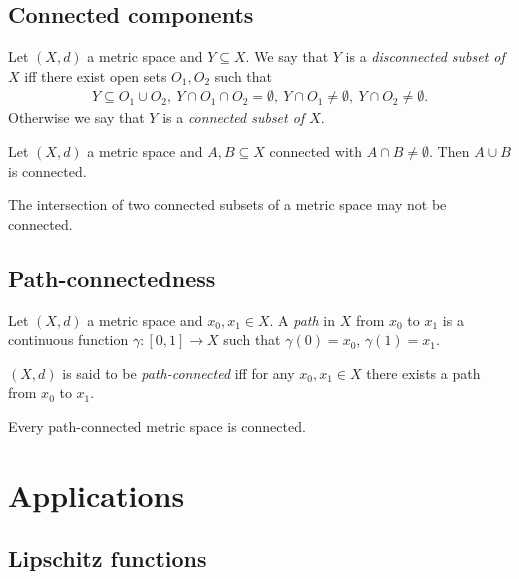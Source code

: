 \documentclass{article}
\begin{document}
\subsection{Connected components}

\begin{definition}
	Let $(X,d)$ a metric space and $Y\subseteq X$. We say that $Y$ is a \emph{disconnected
		subset of $X$} iff there exist open sets $O_1,O_2$ such that
	\begin{align*}
		Y\subseteq O_1\cup O_2,\: Y\cap O_1\cap O_2 = \emptyset,\: Y\cap O_1\neq\emptyset,
		\:Y\cap O_2\not=\emptyset.
	\end{align*}
	Otherwise we say that $Y$ is a \emph{connected subset of $X$}.
\end{definition}

\begin{proposition}[10.11]
	Let $(X,d)$ a metric space and $A,B\subseteq X$ connected with $A\cap B\neq\emptyset$.
	Then $A\cup B$ is connected.
\end{proposition}

\begin{lemma}
	The intersection of two connected subsets of a metric space may not be connected.
\end{lemma}

\subsection{Path-connectedness}

\begin{definition}
	Let $(X,d)$ a metric space and $x_0,x_1\in X$. A \emph{path} in $X$ from $x_0$ to $x_1$ is a
	continuous function $\gamma:[0,1]\to X$ such that $\gamma(0)=x_0$, $\gamma(1)=x_1$.

	$(X,d)$ is said to be \emph{path-connected} iff for any $x_0,x_1\in X$ there exists a path
	from $x_0$ to $x_1$.
\end{definition}

\begin{proposition}
	Every path-connected metric space is connected.
\end{proposition}

\section{Applications}

\subsection{Lipschitz functions}
\end{document}

